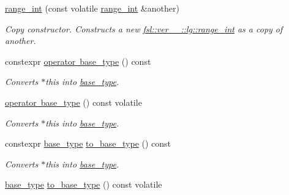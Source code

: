 \begin{DoxyCompactItemize}
\mbox{\label{classfsl_1_1ver__1__0_1_1lg_1_1range__int_ad9f1cb92a0ad431eb59f15f207329e48}} 
\mbox{\hyperlink{classfsl_1_1ver__1__0_1_1lg_1_1range__int_ad9f1cb92a0ad431eb59f15f207329e48}{range\+\_\+int}} (const volatile \mbox{\hyperlink{classfsl_1_1ver__1__0_1_1lg_1_1range__int}{range\+\_\+int}} \&another)
\begin{DoxyCompactList}\small\item\em Copy constructor. Constructs a new \mbox{\hyperlink{classfsl_1_1ver__1__0_1_1lg_1_1range__int}{fsl\+::ver\+\_\+\_\+::lg\+::range\+\_\+int}} as a copy of {\itshape another}. \end{DoxyCompactList}\item 
constexpr \mbox{\hyperlink{classfsl_1_1ver__1__0_1_1lg_1_1range__int_a0b4a2f845550553abc83cbe4c6203403}{operator base\+\_\+type}} () const
\begin{DoxyCompactList}\small\item\em Converts {\itshape $\ast$this} into \mbox{\hyperlink{classfsl_1_1ver__1__0_1_1lg_1_1range__int_aa6c763f6d72d18c8b9129c0c06628cd3}{base\+\_\+type}}. \end{DoxyCompactList}\item 
\mbox{\hyperlink{classfsl_1_1ver__1__0_1_1lg_1_1range__int_a3f3fcff2153745e175aecde28cac6aef}{operator base\+\_\+type}} () const volatile
\begin{DoxyCompactList}\small\item\em Converts {\itshape $\ast$this} into \mbox{\hyperlink{classfsl_1_1ver__1__0_1_1lg_1_1range__int_aa6c763f6d72d18c8b9129c0c06628cd3}{base\+\_\+type}}. \end{DoxyCompactList}\item 
constexpr \mbox{\hyperlink{classfsl_1_1ver__1__0_1_1lg_1_1range__int_aa6c763f6d72d18c8b9129c0c06628cd3}{base\+\_\+type}} \mbox{\hyperlink{classfsl_1_1ver__1__0_1_1lg_1_1range__int_af7d701628aa12325db4b137df7af0973}{to\+\_\+base\+\_\+type}} () const
\begin{DoxyCompactList}\small\item\em Converts {\itshape $\ast$this} into \mbox{\hyperlink{classfsl_1_1ver__1__0_1_1lg_1_1range__int_aa6c763f6d72d18c8b9129c0c06628cd3}{base\+\_\+type}}. \end{DoxyCompactList}\item 
\mbox{\hyperlink{classfsl_1_1ver__1__0_1_1lg_1_1range__int_aa6c763f6d72d18c8b9129c0c06628cd3}{base\+\_\+type}} \mbox{\hyperlink{classfsl_1_1ver__1__0_1_1lg_1_1range__int_a3bd257f95d32d31711637af7eca06515}{to\+\_\+base\+\_\+type}} () const volatile

\end{DoxyCompactItemize}
